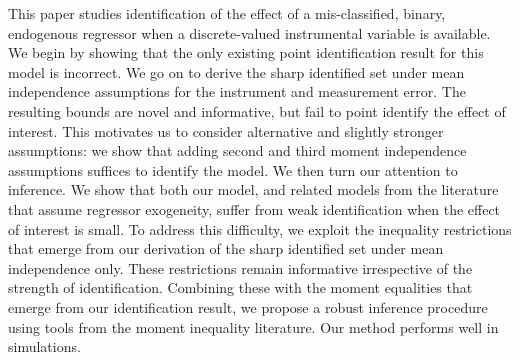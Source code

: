 This paper studies identification of the effect of a mis-classified, binary, endogenous regressor when a discrete-valued instrumental variable is available. 
We begin by showing that the only existing point identification result for this model is incorrect. 
We go on to derive the sharp identified set under mean independence assumptions for the instrument and measurement error.
The resulting bounds are novel and informative, but fail to point identify the effect of interest.
This motivates us to consider alternative and slightly stronger assumptions: we show that adding second and third moment independence assumptions suffices to identify the model.
We then turn our attention to inference.
We show that both our model, and related models from the literature that assume regressor exogeneity, suffer from weak identification when the effect of interest is small.
To address this difficulty, we exploit the inequality restrictions that emerge from our derivation of the sharp identified set under mean independence only.
These restrictions remain informative irrespective of the strength of identification.
Combining these with the moment equalities that emerge from our identification result, we propose a robust inference procedure using tools from the moment inequality literature.
Our method performs well in simulations.

